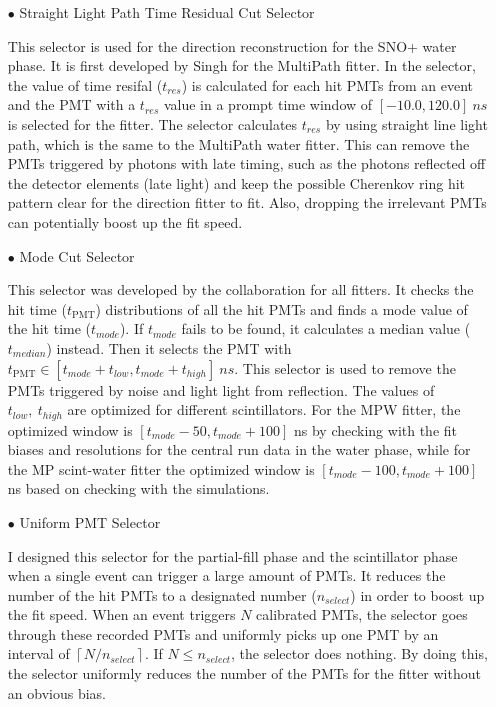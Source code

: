 \begin{itemize}
	\item[$\bullet$] Straight Light Path Time Residual Cut Selector
	
	This selector is used for the direction reconstruction for the SNO+ water phase. It is first developed by Singh for the MultiPath fitter. In the selector, the value of time resifal ($t_{res}$) is calculated for each hit PMTs from an event and the PMT with a $t_{res}$ value in a prompt time window of $[-10.0, 120.0]~ns$ is selected for the fitter. The selector calculates $t_{res}$ by using straight line light path, which is the same to the MultiPath water fitter. This can remove the PMTs triggered by photons with late timing, such as the photons reflected off the detector elements (late light) and keep the possible Cherenkov ring hit pattern clear for the direction fitter to fit. Also, dropping the irrelevant PMTs can potentially boost up the fit speed.
	
	\item[$\bullet$] Mode Cut Selector
	
	This selector was developed by the collaboration for all fitters. It checks the hit time ($t_\mathrm{PMT}$) distributions of all the hit PMTs and finds a mode value of the hit time ($t_{mode}$). If $t_{mode}$ fails to be found, it calculates a median value ($t_{median}$) instead\cite{modeCut}. Then it selects the PMT with $t_\mathrm{PMT} \in [t_{mode}+t_{low}, t_{mode}+t_{high}]~ns$. This selector is used to remove the　PMTs triggered by noise and light light from reflection. The values of $t_{low},~t_{high}$ are optimized for different scintillators. For the MPW fitter, the optimized window is $[t_{mode}-50, t_{mode}+100]$ ns by checking with the fit biases and resolutions for the  central run data in the water phase, while for the MP scint-water fitter the optimized window is $[t_{mode}-100, t_{mode}+100]$ ns based on checking with the simulations.
	
	\item[$\bullet$] Uniform PMT Selector
	
	I designed this selector for the partial-fill phase and the scintillator phase when a single event can trigger a large amount of PMTs. It reduces the number of the hit PMTs to a designated number ($n_{select}$) in order to boost up the fit speed. When an event triggers $N$ calibrated PMTs, the selector goes through these recorded PMTs and uniformly picks up one PMT by an interval of $\left \lceil{N/n_{select}}\right \rceil $. If $N\leq n_{select}$, the selector does nothing. By doing this, the selector uniformly reduces the number of the PMTs for the fitter without an obvious bias.
	

\end{itemize}
